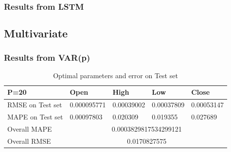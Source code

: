 \documentclass[11pt]{article}
\begin{document}
\subsubsection{Results from LSTM}

\subsection{Multivariate}
\subsubsection{Results from VAR(p)}
\begin{table}[H]
\begin{tabular}{|l|l|l|l|l|}
  \hline
  P=20             & Open        & High       & Low        & Close      \\ \hline
  RMSE on Test set & 0.000095771 & 0.00039002 & 0.00037809 & 0.00053147 \\ \hline
  MAPE on Test set & 0.00097803  & 0.020309   & 0.019355   & 0.027689   \\ \hline
  Overall MAPE     & \multicolumn{4}{c|}{0.0003829817534299121}                   \\ \hline
  Overall RMSE     & \multicolumn{4}{c|}{0.0170827575}                      \\ \hline
\end{tabular}
\caption{Optimal parameters and error on Test set}
\end{table}
\end{document}
